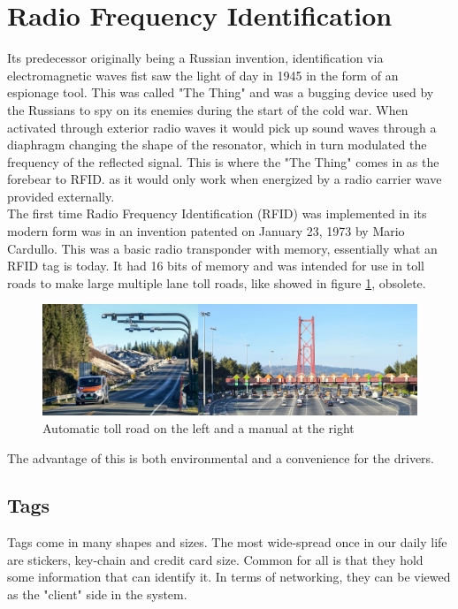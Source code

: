 \section{Radio Frequency Identification}

Its predecessor originally being a Russian invention, identification via electromagnetic waves fist saw the light of day in 1945 in the form of an espionage tool. \cite{2008hacking} This was called "The Thing" and was a bugging device used by the Russians to spy on its enemies during the start of the cold war. \cite{tvedt_2018} When activated through exterior radio waves it  would pick up sound waves through a diaphragm changing the shape of the resonator, which in turn modulated the frequency of the reflected signal. This is where the "The Thing" comes in as the forebear to RFID. as it would only work when energized by a radio carrier wave provided externally.\\

The first time Radio Frequency Identification (RFID) was implemented in its modern form was in an invention patented on January 23, 1973 by Mario Cardullo. \cite{cardullo1973transponder} This was a basic radio transponder with memory, essentially what an RFID tag is today. It had 16 bits of memory and was intended for use in toll roads to make large multiple lane toll roads, like showed in figure \ref{fig:tollroad}, obsolete. 
\begin{figure}[H]
    \centering
    \includegraphics[width=\textwidth]{02_Literature_study/figures/vegpakke-1.jpg}
    \caption{Automatic toll road on the left and a manual at the right}
    \label{fig:tollroad}
\end{figure}

The advantage of this is both environmental and a convenience for the drivers.

\subsection{Tags}
Tags come in many shapes and sizes. The most wide-spread once in our daily life are stickers, key-chain and credit card size. Common for all is that they hold some information that can identify it. In terms of networking, they can be viewed as the "client" side in the system. \cite{cardullo2005genesis}\\

